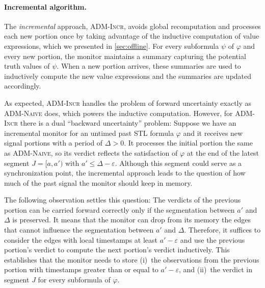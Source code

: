 \paragraph*{Incremental algorithm.}
The \emph{incremental} approach, \textsc{ADM-Incr}, avoids global recomputation and processes each new portion once by taking advantage of the inductive computation of value expressions, which we presented in \cref{sec:offline}.
For every subformula $\psi$ of $\varphi$ and every new portion, the monitor maintains a summary capturing the potential truth values of $\psi$.
When a new portion arrives, these summaries are used to inductively compute the new value expressions and the summaries are updated accordingly.

As expected, \textsc{ADM-Incr} handles the problem of forward uncertainty exactly as \textsc{ADM-Naive} does, which powers the inductive computation.
However, for \textsc{ADM-Incr} there is a dual ``backward uncertainty'' problem:
Suppose we have an incremental monitor for an untimed past STL formula $\varphi$ and it receives new signal portions with a period of $\Delta > 0$.
It processes the initial portion the same as \textsc{ADM-Naive}, so its verdict reflects the satisfaction of $\varphi$ at the end of the latest segment $J = [a, a')$ with $a' \leq \Delta - \varepsilon$.
Although this segment could serve as a synchronization point, the incremental approach leads to the question of how much of the past signal the monitor should keep in memory.

The following observation settles this question:
The verdicts of the previous portion can be carried forward correctly only if the segmentation between $a'$ and $\Delta$ is preserved.
It means that the monitor can drop from its memory the edges that cannot influence the segmentation between $a'$ and $\Delta$.
Therefore, it suffices to consider the edges with local timestamps at least $a' - \varepsilon$ and use the previous portion's verdict to compute the next portion's verdict inductively.
This establishes that the monitor needs to store (i)~the observations from the previous portion with timestamps greater than or equal to $a' - \varepsilon$, and (ii)~the verdict in segment $J$ for every subformula of $\varphi$.

